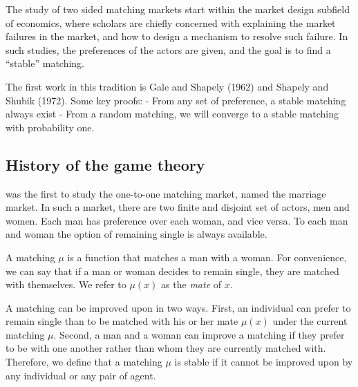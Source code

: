 The study of two sided matching markets start within the market design subfield
of economics, where scholars are chiefly concerned with explaining the market
failures in the market, and how to design a mechanism to resolve such failure.
In such studies, the preferences of the actors are given, and the goal is to
find a ``stable'' matching. 

The first work in this tradition is Gale and Shapely (1962) and Shapely and
Shubik (1972). Some key proofs:
- From any set of preference, a stable matching always exist
- From a random matching, we will converge to a stable matching with probability one.

\subsection{History of the game theory}

\citep{Gale1962} was the first to study the one-to-one matching market, named
the marriage market. In such a market, there are two finite and disjoint set of
actors, men and women. Each man has preference over each woman, and vice versa.
To each man and woman the option of remaining single is always available.

A matching $\mu$ is a function that matches a man with a woman. For convenience,
we can say that if a man or woman decides to remain single, they are matched
with themselves. We refer to $\mu(x)$ as the \textit{mate} of $x$.

A matching can be improved upon in two ways. First, an individual can prefer to
remain single than to be matched with his or her mate $\mu(x)$ under the current
matching $\mu$. Second, a man and a woman can improve a matching if they prefer
to be with one another rather than whom they are currently matched with.
Therefore, we define
that a matching $\mu$ is stable if it cannot be improved upon by any individual
or any pair of agent.  

